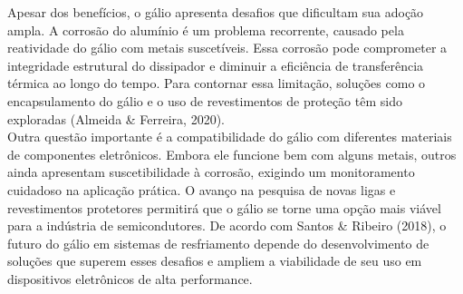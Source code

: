 \documentclass[12pt]{article}
\begin{document}
Apesar dos benefícios, o gálio apresenta desafios que dificultam sua adoção ampla. A corrosão do alumínio é um problema recorrente, causado pela reatividade do gálio com metais suscetíveis. Essa corrosão pode comprometer a integridade estrutural do dissipador e diminuir a eficiência de transferência térmica ao longo do tempo. Para contornar essa limitação, soluções como o encapsulamento do gálio e o uso de revestimentos de proteção têm sido exploradas (Almeida \& Ferreira, 2020).\\
Outra questão importante é a compatibilidade do gálio com diferentes materiais de componentes eletrônicos. Embora ele funcione bem com alguns metais, outros ainda apresentam suscetibilidade à corrosão, exigindo um monitoramento cuidadoso na aplicação prática. O avanço na pesquisa de novas ligas e revestimentos protetores permitirá que o gálio se torne uma opção mais viável para a indústria de semicondutores. De acordo com Santos \& Ribeiro (2018), o futuro do gálio em sistemas de resfriamento depende do desenvolvimento de soluções que superem esses desafios e ampliem a viabilidade de seu uso em dispositivos eletrônicos de alta performance.\\
\end{document}
